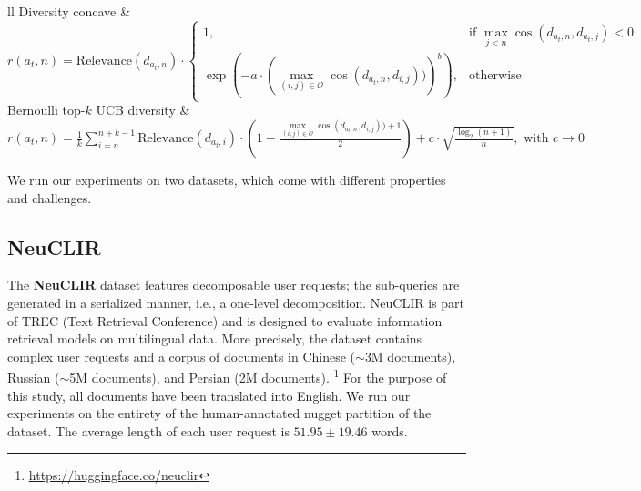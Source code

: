 \begin{table}[!t]
{\begin{tabular}{ll}
    Diversity concave & \(
    r(a_t, n) = \text{Relevance}(d_{a_t, n}) \cdot 
    \begin{cases}
    1, & \text{if } \max\limits_{j < n} \cos(d_{a_t, n}, d_{a_t, j}) < 0 \\
    \exp\left(-a \cdot \left(\max\limits_{(i, j) \in \mathcal{O}} \cos(d_{a_t, n}, d_{i, j}))\right)^b\right), & \text{otherwise}
    \end{cases}
    \)  \\[0.5em]

    Bernoulli top-\(k\) UCB diversity & \( r(a_t, n) = \frac{1}{k} \sum_{i=n}^{n+k-1} \text{Relevance}(d_{a_t, i}) \cdot \left(1 - \frac{\max\limits_{(i, j) \in \mathcal{O}} \cos(d_{a_t, n}, d_{i, j})) + 1}{2}\right) + c \cdot \sqrt{\frac{\log_2(n + 1)}{n}}, \text{ with } c \to 0 \)\\
    \bottomrule
    \end{tabular} }
    \caption{Reward policies used for evaluating sub-query selection strategies. For all but the baseline random, we assume \(n = \min \{ j \in \{1,\ldots,N\} \mid (a_t, j) \notin \mathcal{O} \}\). For the diversity concave policy, we assume \(a=5\) and \(b=15\).}
\label{tab:reward_functions}
\end{table}

We run our experiments on two datasets, which come with different properties and challenges. %

\subsection{NeuCLIR}
The \textbf{NeuCLIR} dataset \cite{lawrie2025overviewtrec2024neuclir} features decomposable user requests; the sub-queries are generated in a serialized manner, i.e., a one-level decomposition. NeuCLIR is part of TREC (Text Retrieval Conference) and is designed to evaluate information retrieval models on multilingual data. More precisely, the dataset contains complex user requests and a corpus of documents in Chinese ($\sim$3M documents), Russian ($\sim$5M documents), and Persian (2M documents). \footnote{\url{https://huggingface.co/neuclir}} For the purpose of this study, all documents have been translated into English. We run our experiments on the entirety of the human-annotated nugget partition of the dataset. The average length of each user request is \(51.95 \pm 19.46\) words.

